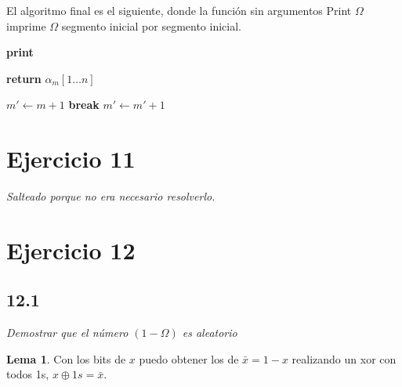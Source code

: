 \documentclass{article}
\theoremstyle{definition} %
\newtheorem{lemma}{Lema}
\newcommand{\firstn}[1]{\first{n}{#1}}
\newcommand{\first}[2]{#2[1 \dots #1]}
\begin{document}
El algoritmo final es el siguiente, donde la función sin argumentos Print
$\Omega$ imprime $\Omega$ segmento inicial por segmento inicial.

\begin{algorithmic}

            \State \textbf{print} 
        \EndFor

    \EndFunction


            \State \textbf{return} $\firstn{\alpha_m}$
        \EndIf
    \EndFor

\EndFunction
        \State $m' \gets m + 1$
            \If{$\firstn{\alpha_m} \neq \firstn{\alpha_m'}$}
            \State \textbf{break}
            \EndIf
            \State $m' \gets m' + 1$
        \EndWhile
    \EndFunction
\end{algorithmic}

\section*{Ejercicio 11}

\textit{Salteado porque no era necesario resolverlo.}

\section*{Ejercicio 12}

\subsection*{12.1}

\textit{Demostrar que el número $(1 - \Omega)$ es aleatorio}

\begin{lemma}\label{lemma:xor-bits}
    Con los bits de $x$ puedo obtener los de $\bar{x} = 1 - x$ realizando un xor con
    todos 1s, $x \oplus 1s = \bar{x}$.
\end{lemma}
\end{document}
